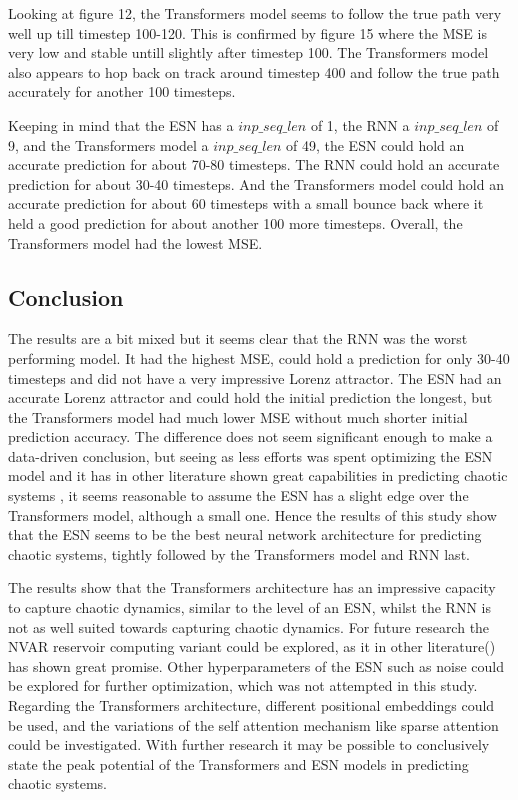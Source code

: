 \documentclass[11pt]{article}
\begin{document}
Looking at figure 12, the Transformers model seems to follow the true path very well up till timestep 100-120. This is confirmed by figure 15 where the MSE is very low and stable untill slightly after timestep 100. The Transformers model also appears to hop back on track around timestep 400 and follow the true path accurately for another 100 timesteps.

Keeping in mind that the ESN has a $inp\_seq\_len$ of 1, the RNN a $inp\_seq\_len$ of 9, and the Transformers model a $inp\_seq\_len$ of 49, the ESN could hold an accurate prediction for about 70-80 timesteps. The RNN could hold an accurate prediction for about 30-40 timesteps. And the Transformers model could hold an accurate prediction for about 60 timesteps with a small bounce back where it held a good prediction for about another 100 more timesteps. Overall, the Transformers model had the lowest MSE.

\subsection{Conclusion}
The results are a bit mixed but it seems clear that the RNN was the worst performing model. It had the highest MSE, could hold a prediction for only 30-40 timesteps and did not have a very impressive Lorenz attractor. The ESN had an accurate Lorenz attractor and could hold the initial prediction the longest, but the Transformers model had much lower MSE without much shorter initial prediction accuracy. The difference does not seem significant enough to make a data-driven conclusion, but seeing as less efforts was spent optimizing the ESN model and it has in other literature shown great capabilities in predicting chaotic systems \cite{npg-27-373-2020}, it seems reasonable to assume the ESN has a slight edge over the Transformers model, although a small one. Hence the results of this study show that the ESN seems to be the best neural network architecture for predicting chaotic systems, tightly followed by the Transformers model and RNN last.

The results show that the Transformers architecture has an impressive capacity to capture chaotic dynamics, similar to the level of an ESN, whilst the RNN is not as well suited towards capturing chaotic dynamics. For future research the NVAR reservoir computing variant could be explored, as it in other literature(\cite{cite-key}) has shown great promise. Other hyperparameters of the ESN such as noise could be explored for further optimization, which was not attempted in this study. Regarding the Transformers architecture, different positional embeddings could be used, and the variations of the self attention mechanism like sparse attention could be investigated. With further research it may be possible to conclusively state the peak potential of the Transformers and ESN models in predicting chaotic systems.
\end{document}
